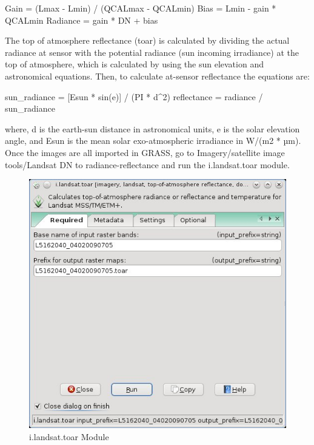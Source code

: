 \begin{smallverbatim}
Gain = (Lmax - Lmin) / (QCALmax - QCALmin) 
Bias = Lmin - gain * QCALmin 
Radiance = gain * DN + bias 
\end{smallverbatim}

The top of atmosphere reflectance (toar) is calculated by dividing the actual radiance at sensor with the potential radiance (sun incoming irradiance) at the top of atmosphere, which is calculated by using the sun elevation and astronomical equations.\newline
Then, to calculate at-sensor reflectance the equations are: \newline
\begin{smallverbatim}
sun_radiance = [Esun * sin(e)] / (PI * d^2) 
reflectance = radiance / sun_radiance 
\end{smallverbatim}

where, d is the earth-sun distance in astronomical units, e is the solar elevation angle, and Esun is the mean solar exo-atmospheric irradiance in W/(m2 * µm). \newline
Once the images are all imported in GRASS, go to Imagery/satellite image tools/Landsat DN to radiance-reflectance and run the i.landsat.toar module. \newline

\begin{figure}[htbp]
   \centering
   \includegraphics[scale=0.4]{gipe012.png}
   \caption{i.landsat.toar Module}
   \label{fig:gipe012}
\end{figure}

